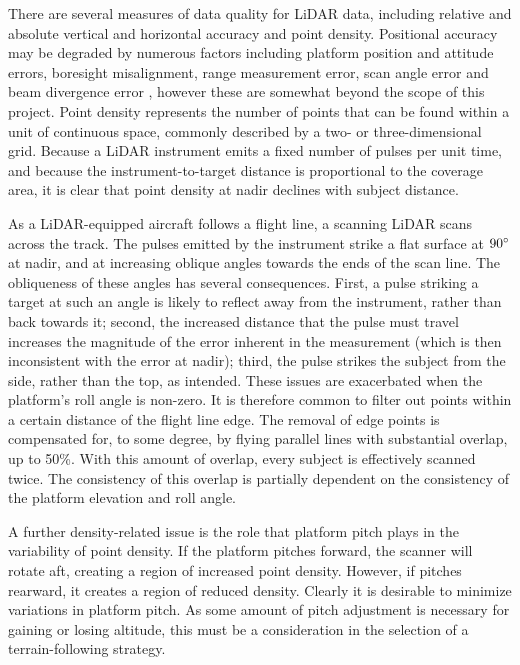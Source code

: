 \documentclass[10pt]{article}
\begin{document}
There are several measures of data quality for LiDAR data, including relative and absolute vertical and horizontal accuracy and point density. Positional accuracy may be degraded by numerous factors including platform position and attitude errors, boresight misalignment, range measurement error, scan angle error and beam divergence error \cite{May2007}, however these are somewhat beyond the scope of this project. Point density represents the number of points that can be found within a unit of continuous space, commonly described by a two- or three-dimensional grid. Because a LiDAR instrument emits a fixed number of pulses per unit time, and because the instrument-to-target distance is proportional to the coverage area, it is clear that point density at nadir declines with subject distance. 

As a LiDAR-equipped aircraft follows a flight line, a scanning LiDAR scans across the track. The pulses emitted by the instrument strike a flat surface at $90\degree$ at nadir, and at increasing oblique angles towards the ends of the scan line. The obliqueness of these angles has several consequences. First, a pulse striking a target at such an angle is likely to reflect away from the instrument, rather than back towards it; second, the increased distance that the pulse must travel increases the magnitude of the error inherent in the measurement (which is then inconsistent with the error at nadir); third, the pulse strikes the subject from the side, rather than the top, as intended. These issues are exacerbated when the platform's roll angle is non-zero. It is therefore common to filter out points within a certain distance of the flight line edge. The removal of edge points is compensated for, to some degree, by flying parallel lines with substantial overlap, up to 50\%. With this amount of overlap, every subject is effectively scanned twice. The consistency of this overlap is partially dependent on the consistency of the platform elevation and roll angle.

A further density-related issue is the role that platform pitch plays in the variability of point density. If the platform pitches forward, the scanner will rotate aft, creating a region of increased point density. However, if pitches rearward, it creates a region of reduced density. Clearly it is desirable to minimize variations in platform pitch. As some amount of pitch adjustment is necessary for gaining or losing altitude, this must be a consideration in the selection of a terrain-following strategy.
\end{document}
